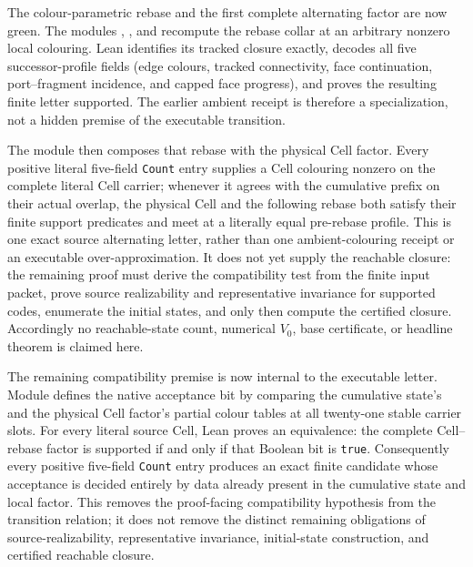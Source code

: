 \documentclass[11pt]{article}
\theoremstyle{definition}
\begin{document}
The colour-parametric rebase and the first complete alternating factor are now
green.  The modules
,
,
and
recompute the rebase collar at an arbitrary nonzero local colouring.  Lean
identifies its tracked closure exactly, decodes all five successor-profile
fields (edge colours, tracked connectivity, face continuation, port--fragment
incidence, and capped face progress), and proves the resulting finite letter
supported.  The earlier ambient receipt is therefore a specialization, not a
hidden premise of the executable transition.

The module
then composes that rebase with the physical Cell factor.  Every positive
literal five-field \texttt{Count} entry supplies a Cell colouring nonzero on
the complete literal Cell carrier; whenever it agrees with the cumulative
prefix on their actual overlap, the physical Cell and the following rebase
both satisfy their finite support predicates and meet at a literally equal
pre-rebase profile.  This is one exact source alternating letter, rather than
one ambient-colouring receipt or an executable over-approximation.  It does
not yet supply the reachable closure: the remaining proof must derive the
compatibility test from the finite input packet, prove source realizability and
representative invariance for supported codes, enumerate the initial states,
and only then compute the certified closure.  Accordingly no reachable-state
count, numerical $V_0$, base certificate, or headline theorem is claimed here.

The remaining compatibility premise is now internal to the executable letter.
Module
defines the native acceptance bit by comparing the cumulative state's and the
physical Cell factor's partial colour tables at all twenty-one stable carrier
slots.  For every literal source Cell, Lean proves an equivalence: the complete
Cell--rebase factor is supported if and only if that Boolean bit is
\texttt{true}.  Consequently every positive five-field \texttt{Count} entry
produces an exact finite candidate whose acceptance is decided entirely by
data already present in the cumulative state and local factor.  This removes
the proof-facing compatibility hypothesis from the transition relation; it
does not remove the distinct remaining obligations of source-realizability,
representative invariance, initial-state construction, and certified reachable
closure.
\end{document}
